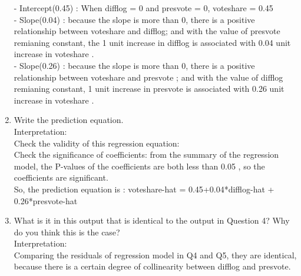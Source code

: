 \documentclass[12pt,letterpaper]{article}
\begin{document}
\begin{enumerate}
		- Intercept(0.45) : When difflog = 0 and presvote = 0, voteshare = 0.45\\
		- Slope(0.04) : because the slope is more than 0, there is a positive relationship between voteshare and difflog; and with the value of presvote remianing constant, the 1 unit increase in difflog is associated with 0.04 unit increase in voteshare .  \\
		- Slope(0.26) : because the slope is more than 0, there is a positive relationship between voteshare and presvote ; and with the value of difflog remianing constant, 1 unit increase in presvote is associated with 0.26 unit increase in voteshare . \\
		\item Write the prediction equation.\\	\vspace{5cm}
		\noindent
		Interpretation:\\
		Check the validity of this regression equation:\\
		Check the significance of coefficients: from the summary of the regression model, the P-values of the coefficients are both less than 0.05 , so the coefficients are significant.\\
		
		So, the prediction equation is : voteshare-hat = 0.45+0.04*difflog-hat + 0.26*presvote-hat 
		\item What is it in this output that is identical to the output in Question 4? Why do you think this is the case?\\ \vspace{1cm}
		\noindent
		Interpretation:\\
		Comparing the residuals of regression model in Q4 and Q5, they are identical, because there is a certain degree of collinearity between difflog and presvote.
	\end{enumerate}
\end{document}
